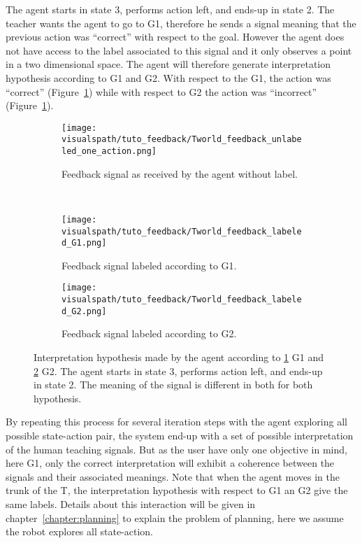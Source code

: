 The agent starts in state 3, performs action left, and ends-up in state 2. The teacher wants the agent to go to G1, therefore he sends a signal meaning that the previous action was ``correct'' with respect to the goal. However the agent does not have access to the label associated to this signal and it only observes a point in a two dimensional space. The agent will therefore generate interpretation hypothesis according to G1 and G2. With respect to the G1, the action was ``correct'' (Figure~\ref{fig:TworldLabelG1}) while with respect to G2 the action was ``incorrect'' (Figure~\ref{fig:TworldLabelG1}).

\begin{figure}[!ht]
    \centering
    \begin{subfigure}[b]{\tworldsize\columnwidth}
        \centering
        \texttt{[image: \\visualspath/tuto\_feedback/Tworld\_feedback\_unlabeled\_one\_action.png]}
        \caption{Feedback signal as received by the agent without label.}
    \end{subfigure}\\
    \begin{subfigure}[b]{\tworldsize\columnwidth}
        \centering
        \texttt{[image: \\visualspath/tuto\_feedback/Tworld\_feedback\_labeled\_G1.png]}
        \caption{Feedback signal labeled according to G1.}
        \label{fig:TworldLabelG1}
    \end{subfigure}
    \begin{subfigure}[b]{\tworldsize\columnwidth}
        \centering
        \texttt{[image: \\visualspath/tuto\_feedback/Tworld\_feedback\_labeled\_G2.png]}
        \caption{Feedback signal labeled according to G2.}
        \label{fig:TworldLabelG2}
    \end{subfigure}
    \caption{Interpretation hypothesis made by the agent according to \ref{fig:TworldLabelG1} G1 and \ref{fig:TworldLabelG2} G2. The agent starts in state 3, performs action left, and ends-up in state 2. The meaning of the signal is different in both for both hypothesis.}
    \label{fig:TworldLabelOneStep}
\end{figure}

By repeating this process for several iteration steps with the agent exploring all possible state-action pair, the system end-up with a set of possible interpretation of the human teaching signals. But as the user have only one objective in mind, here G1, only the correct interpretation will exhibit a coherence between the signals and their associated meanings. Note that when the agent moves in the trunk of the T, the interpretation hypothesis with respect to G1 an G2 give the same labels. Details about this interaction will be given in chapter~\ref{chapter:planning} to explain the problem of planning, here we assume the robot explores all state-action.

